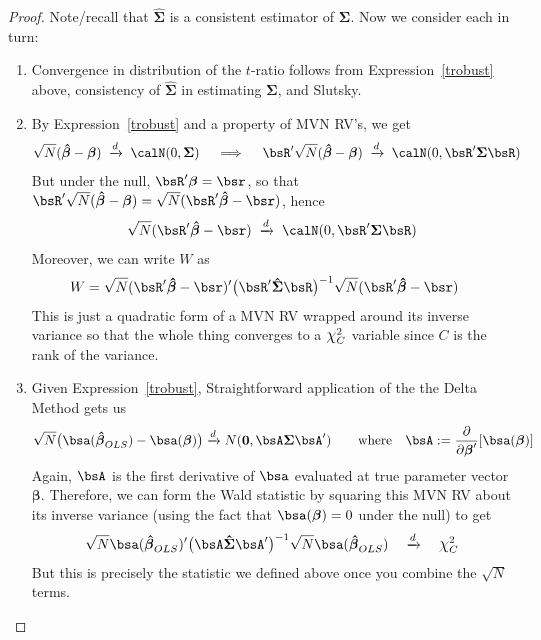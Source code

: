 \documentclass[12pt]{article}
\theoremstyle{plain}
\theoremstyle{definition}
\theoremstyle{remark}
\newcommand*{\Chi}{\mbox{\large$\chi$}} %
\newcommand{\bsSigma}{\boldsymbol{\Sigma}}
\newcommand{\bsbeta}{\boldsymbol{\beta}}
\newcommand{\bshatbeta}{\boldsymbol{\hat{\beta}}}
\newcommand{\bshatSigma}{\boldsymbol{\hat{\Sigma}}}
\renewcommand{\bso}{\boldsymbol{0}}
\newcommand{\dto}{\xrightarrow{d}}
\begin{document}
\begin{proof}
Note/recall that $\bshatSigma$ is a consistent estimator of $\bsSigma$.
Now we consider each in turn:
\begin{enumerate}
  \item Convergence in distribution of the $t$-ratio follows from
    Expression~\ref{trobust} above, consistency of $\bshatSigma$ in
    estimating $\bsSigma$, and Slutsky.

  \item
    By Expression~\ref{trobust} and a property of MVN RV's, we get
    \begin{align*}
      \sqrt{N}(\bshatbeta - \bsbeta)
      \; &\dto \;
      \calN(0,\bsSigma)
      \quad\implies\quad
      \bsR'\sqrt{N}(\bshatbeta - \bsbeta)
      \; \dto \;
      \calN(0,\bsR'\bsSigma\bsR)
    \end{align*}
    But under the null, $\bsR'\bsbeta = \bsr$, so that
    $\bsR'\sqrt{N}(\bshatbeta - \bsbeta)
    =
    \sqrt{N}(\bsR'\bshatbeta - \bsr)$,
    hence
    \begin{align*}
      \sqrt{N}(\bsR'\bshatbeta - \bsr)
      \; \dto \;
      \calN(0,\bsR'\bsSigma\bsR)
    \end{align*}
    Moreover, we can write $W$ as
    \begin{align*}
      W &=
      \sqrt{N}
      (\bsR'\bshatbeta-\bsr)'
      \big(
      \bsR'\bshatSigma\bsR
      \big)^{-1}
      \sqrt{N}
      (\bsR'\bshatbeta-\bsr)
    \end{align*}
    This is just a quadratic form of a MVN RV wrapped around its inverse
    variance so that the whole thing converges to a $\Chi^2_C$ variable
    since $C$ is the rank of the variance.

  \item
    Given Expression~\ref{trobust}, Straightforward application of the
    the Delta Method gets us
    \begin{align*}
      \sqrt{N}\big(
        \bsa(\bshatbeta_{OLS})
        -
        \bsa(\bsbeta)
      \big)
      \dto N(\bso,\bsA \bsSigma \bsA')
      \qquad \text{where}\quad
      \bsA := \frac{\partial}{\partial \bsbeta'}[\bsa(\bsbeta)]
    \end{align*}
    Again, $\bsA$ is the first derivative of $\bsa$ evaluated at true
    parameter vector $\bsbeta$. Therefore, we can form the Wald
    statistic by squaring this MVN RV about its inverse variance (using
    the fact that $\bsa(\bsbeta)=0$ under the null) to get
    \begin{align*}
      \sqrt{N}
      \bsa(\bshatbeta_{OLS})'
      \big(
      \bsA \bshatSigma \bsA'
      \big)^{-1}
      \sqrt{N}
      \bsa(\bshatbeta_{OLS})
      \quad \dto\quad \Chi^2_C
    \end{align*}
    But this is precisely the statistic we defined above once you
    combine the $\sqrt{N}$ terms.
\end{enumerate}
\end{proof}
\end{document}
